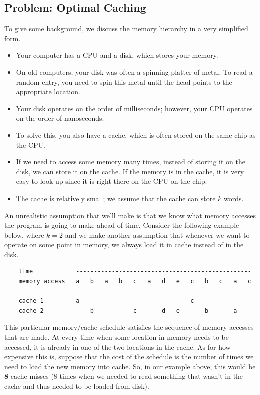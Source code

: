 \documentclass[letterpaper]{article}
\begin{document}
\subsection{Problem: Optimal Caching}
To give some background, we discuss the memory hierarchy in a very simplified form.
\begin{itemize}
    \item Your computer has a CPU and a disk, which stores your memory. 
    \item On old computers, your disk was often a spinning platter of metal. To read a random entry, you need to spin this metal until the head points to the appropriate location. 
    \item Your disk operates on the order of milliseconds; however, your CPU operates on the order of nanoseconds. 
    \item To solve this, you also have a cache, which is often stored on the same chip as the CPU. 
    \item If we need to access some memory many times, instead of storing it on the disk, we can store it on the cache. If the memory is in the cache, it is very easy to look up since it is right there on the CPU on the chip. 
    \item The cache is relatively small; we assume that the cache can store $k$ words.
\end{itemize}
An unrealistic assumption that we'll make is that we know what memory accesses the program is going to make ahead of time. Consider the following example below, where $k = 2$ and we make another assumption that whenever we want to operate on some point in memory, we always load it in cache instead of in the disk. 
\begin{verbatim}
    time            -------------------------------------------------       
    memory access   a   b   a   b   c   a   d   e   c   b   c   a   c

    cache 1         a   -   -   -   -   -   -   -   c   -   -   -   -       
    cache 2             b   -   -   c   -   d   e   -   b   -   a   -
\end{verbatim}
This particular memory/cache schedule satisfies the sequence of memory accesses that are made. At every time when some location in memory needs to be accessed, it is already in one of the two locations in the cache. As for how expensive this is, suppose that the cost of the schedule is the number of times we need to load the new memory into cache. So, in our example above, this would be \textbf{8} cache misses (8 times when we needed to read something that wasn't in the cache and thus needed to be loaded from disk).
\end{document}
